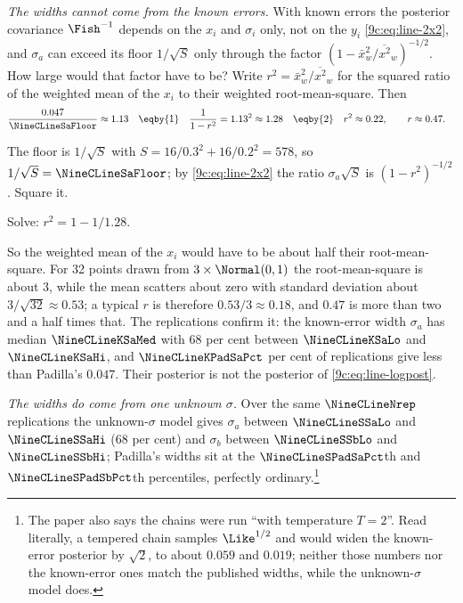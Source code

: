 \emph{The widths cannot come from the known errors.} With known errors the posterior covariance $\Fish^{-1}$
depends on the $x_i$ and $\sigma_i$ only, not on the $y_i$ \eqref{9c:eq:line-2x2}, and $\sigma_a$ can exceed
its floor $1/\sqrt S$ only through the factor $(1-\bar x_w^2/\overline{x^2}_w)^{-1/2}$. How large would that
factor have to be? Write $r^2=\bar x_w^2/\overline{x^2}_w$ for the squared ratio of the weighted mean of the
$x_i$ to their weighted root-mean-square. Then
\begin{align}
  \frac{0.047}{\NineCLineSaFloor}\approx1.13
  \quad&\eqby{1}\quad\frac{1}{1-r^2}=1.13^2\approx1.28
  \quad\eqby{2}\quad r^2\approx0.22,\qquad r\approx0.47 .
  \label{9c:eq:padilla-r}
\end{align}
\begin{explain}
  \item The floor is $1/\sqrt S$ with $S=16/0.3^2+16/0.2^2=578$, so $1/\sqrt S=\NineCLineSaFloor$; by
        \eqref{9c:eq:line-2x2} the ratio $\sigma_a\sqrt S$ is $(1-r^2)^{-1/2}$. Square it.
  \item Solve: $r^2=1-1/1.28$.
\end{explain}
So the weighted mean of the $x_i$ would have to be about half their root-mean-square. For 32 points drawn
from $3\times\Normal(0,1)$ the root-mean-square is about $3$, while the mean scatters about zero with standard
deviation about $3/\sqrt{32}\approx0.53$; a typical $r$ is therefore $0.53/3\approx0.18$, and $0.47$ is
more than two and a half times that. The replications confirm it: the known-error width $\sigma_a$ has
median $\NineCLineKSaMed$ with 68 per cent between $\NineCLineKSaLo$ and $\NineCLineKSaHi$, and
$\NineCLineKPadSaPct$ per cent of replications give less than Padilla's $0.047$. Their posterior is not
the posterior of \eqref{9c:eq:line-logpost}.

\emph{The widths do come from one unknown $\sigma$.} Over the same $\NineCLineNrep$ replications the
unknown-$\sigma$ model gives $\sigma_a$ between $\NineCLineSSaLo$ and $\NineCLineSSaHi$ (68 per cent) and
$\sigma_b$ between $\NineCLineSSbLo$ and $\NineCLineSSbHi$; Padilla's widths sit at the
$\NineCLineSPadSaPct$th and $\NineCLineSPadSbPct$th percentiles, perfectly ordinary.\footnote{The paper also
says the chains were run ``with temperature $T=2$''. Read literally, a tempered chain samples $\Like^{1/2}$
and would widen the known-error posterior by $\sqrt2$, to about $0.059$ and $0.019$; neither those numbers
nor the known-error ones match the published widths, while the unknown-$\sigma$ model does.}

